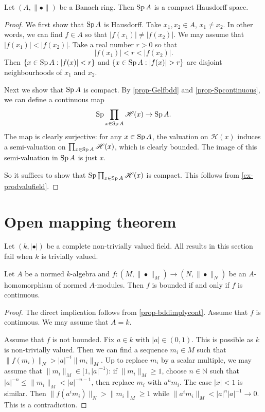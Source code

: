 \begin{thm}
    Let $(A,\|\bullet\|)$ be a Banach ring. Then $\operatorname{Sp} A$ is a compact Hausdorff space.
\end{thm}
\begin{proof}
    We first show that $\operatorname{Sp} A$ is Hausdorff. Take $x_1, x_2\in A$, $x_1\neq x_2$. In other words, we can find $f\in A$ so that $|f(x_1)|\neq |f(x_2)|$. We may assume that     $|f(x_1)|< |f(x_2)|$. Take a real number $r>0$ so that
    \[
        |f(x_1)|< r <|f(x_2)|.
    \]
    Then $\{x\in \operatorname{Sp} A: |f(x)|<r\}$ and $\{x\in \Sp A: |f(x)|>r\}$ are disjoint neighbourhoods of $x_1$ and $x_2$.

    Next we show that $\operatorname{Sp} A$ is compact. By \cref{prop-Gelfbdd} and \cref{prop-Spcontinuous}, we can define a continuous map
    \[
        \operatorname{Sp} \prod_{x\in \operatorname{Sp} A}\mathscr{H}(x)\rightarrow \operatorname{Sp} A.  
    \]
    The map is clearly surjective: for any $x\in \operatorname{Sp} A$, the valuation on $\mathscr{H}(x)$ induces a semi-valuation on  $\prod_{x\in \operatorname{Sp} A}\mathscr{H}(x)$, which is clearly bounded. The image of this semi-valuation in $\operatorname{Sp} A$ is just $x$.

    So it suffices to show that $\operatorname{Sp} \prod_{x\in \operatorname{Sp} A}\mathscr{H}(x)$ is compact. This follows from \cref{ex-prodvalufield}.
\end{proof}



\section{Open mapping theorem}
Let $(k,|\bullet|)$ be a complete non-trivially valued field. All results in this section fail when $k$ is trivially valued.

\begin{proposition}\label{prop-bddequivcont}
    Let $A$ be a normed $k$-algebra and $f:(M,\|\bullet\|_M)\rightarrow (N,\|\bullet\|_N)$ be an $A$-homomorphism of normed $A$-modules. Then $f$ is bounded if and only if $f$ is continuous. 
\end{proposition}
\begin{proof}
    The direct implication follows from \cref{prop-bddimplycont}. Assume that $f$ is continuous. We may assume that $A=k$. 

    Assume that $f$ is not bounded. Fix $a\in k$ with $|a|\in (0,1)$. This is possible as $k$ is non-trivially valued.
    Then we can find a sequence $m_i\in M$ such that $\|f(m_i)\|_N>|a|^{-i}\|m_i\|_M$. Up to replace $m_i$ by a scalar multiple, we may assume that $\|m_i\|_M\in [1,|a|^{-1})$: if $\|m_i\|_M\geq 1$, choose $n\in \mathbb{N}$ such that $|a|^{-n}\leq \|m_i\|_M<|a|^{-n-1}$, then replace $m_i$ with $a^nm_i$. The case $|x|<1$ is similar. 
    Then $\|f(a^im_i)\|_N>\|m_i\|_M\geq 1$ while $\|a^im_i\|_M<|a|^n |a|^{-1}\to 0$. This is a contradiction.
\end{proof}

